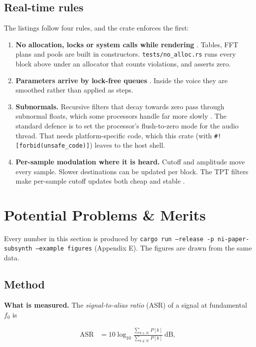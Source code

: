 \documentclass[conference]{IEEEtran}
\begin{document}
\setcounter{subsection}{9}
\subsection{Real-time rules}
The listings follow four rules, and the crate enforces the first:

\begin{enumerate}
\item \textbf{No allocation, locks or system calls while rendering} \cite{r2}. Tables, FFT plans and pools are built in constructors. \texttt{tests/\allowbreak{}no\_\allowbreak{}alloc.\allowbreak{}rs} runs every block above under an allocator that counts violations, and asserts zero.
\item \textbf{Parameters arrive by lock-free queues} \cite{r15}. Inside the voice they are smoothed rather than applied as steps.
\item \textbf{Subnormals.} Recursive filters that decay towards zero pass through subnormal floats, which some processors handle far more slowly \cite{r8}. The standard defence is to set the processor's flush-to-zero mode for the audio thread. That needs platform-specific code, which this crate (with \texttt{\#\allowbreak{}![forbid(unsafe\_\allowbreak{}code)]}) leaves to the host shell.
\item \textbf{Per-sample modulation where it is heard.} Cutoff and amplitude move every sample. Slower destinations can be updated per block. The TPT filters make per-sample cutoff updates both cheap and stable \cite{r41}.
\end{enumerate}

\setcounter{section}{3}
\section{Potential Problems \& Merits}
Every number in this section is produced by \texttt{cargo run --release -p ni-paper-subsynth --example figures} (Appendix E). The figures are drawn from the same data.

\setcounter{subsection}{0}
\subsection{Method}
\textbf{What is measured.} The \emph{signal-to-alias ratio} (ASR) of a signal at fundamental $f_0$ is

\begin{equation*}
\begin{aligned}
\mathrm{ASR} &= 10 \log_{10} \frac{\sum_{k \in \mathcal H} P[k]}{\sum_{k \notin \mathcal H} P[k]} \ \text{dB},
\end{aligned}
\tag{16}
\end{equation*}
\end{document}
